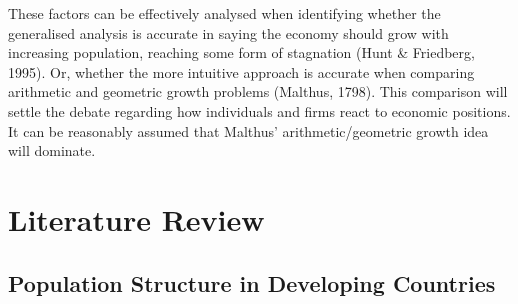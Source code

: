 \documentclass[11pt, english]{article}
\begin{document}
	These factors can be effectively analysed when identifying whether the generalised analysis is accurate in saying the economy should grow with increasing population, reaching some form of stagnation (Hunt \& Friedberg, 1995). Or, whether the more intuitive approach is accurate when comparing arithmetic and geometric growth problems (Malthus, 1798). This comparison will settle the debate regarding how individuals and firms react to economic positions. It can be reasonably assumed that Malthus’ arithmetic/geometric growth idea will dominate.

\newpage

\section{Literature Review}

	\subsection{Population Structure in Developing Countries}
\end{document}
